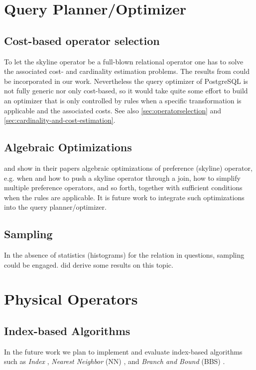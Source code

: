 \section{Query Planner/Optimizer}
\subsection{Cost-based operator selection}
\label{sec:cost-based-operator-selection}
To let the skyline operator be a full-blown relational operator one has
to solve the associated cost- and cardinality estimation problems.
The results from \citet{Chaudhuri2006} could be incorporated in our
work.  Nevertheless the query optimizer of PostgreSQL is not fully
generic nor only cost-based, so it would take quite some effort to
build an optimizer that is only controlled by rules when a specific
transformation is applicable and the associated costs. See
also \autoref{sec:operatorselection} and \autoref{sec:cardinality-and-cost-estimation}.

\subsection{Algebraic Optimizations}
\citet{Chomicki2003a} and \citet{Kiessling2003} show in their
papers algebraic optimizations of preference (skyline) operator,
e.g. when and how to push a skyline operator through a join, how to
simplify multiple preference operators, and so forth, together with
sufficient conditions when the rules are applicable.  It is future
work to integrate such optimizations into the query planner/optimizer.

\subsection{Sampling}
\label{sec:sampling}
In the absence of statistics (histograms) for the relation in
questions, sampling could be engaged. \citet{Chaudhuri2006} did
derive some results on this topic.

\section{Physical Operators}
\subsection{Index-based Algorithms}
In the future work we plan to implement and evaluate index-based algorithms 
such as 
{\em Index} \citep{Tan2001}, 
{\em Nearest Neighbor} (NN) \citep{Kossmann2002}, and
{\em Branch and Bound} (BBS) \citep{Papadias2003, Papadias2005}.


